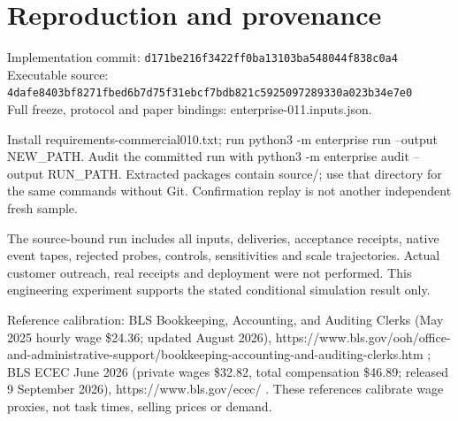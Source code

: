 \documentclass[10pt]{article}
\begin{document}
\section*{Reproduction and provenance}
{\footnotesize Implementation commit: \texttt{d171be216f3422ff0ba13103ba548044f838c0a4}\\ Executable source: \texttt{4dafe8403bf8271fbed6b7d75f31ebcf7bdb821c5925097289330a023b34e7e0}\\ Full freeze, protocol and paper bindings: enterprise-011.inputs.json.\par}
Install requirements-commercial010.txt; run python3 -m enterprise run --output NEW\_PATH. Audit the committed run with python3 -m enterprise audit --output RUN\_PATH. Extracted packages contain source/; use that directory for the same commands without Git. Confirmation replay is not another independent fresh sample.

The source-bound run includes all inputs, deliveries, acceptance receipts, native event tapes, rejected probes, controls, sensitivities and scale trajectories. Actual customer outreach, real receipts and deployment were not performed. This engineering experiment supports the stated conditional simulation result only.

Reference calibration: BLS Bookkeeping, Accounting, and Auditing Clerks (May 2025 hourly wage \$24.36; updated August 2026), https://www.bls.gov/ooh/office-and-administrative-support/bookkeeping-accounting-and-auditing-clerks.htm ; BLS ECEC June 2026 (private wages \$32.82, total compensation \$46.89; released 9 September 2026), https://www.bls.gov/ecec/ . These references calibrate wage proxies, not task times, selling prices or demand.
\end{document}
